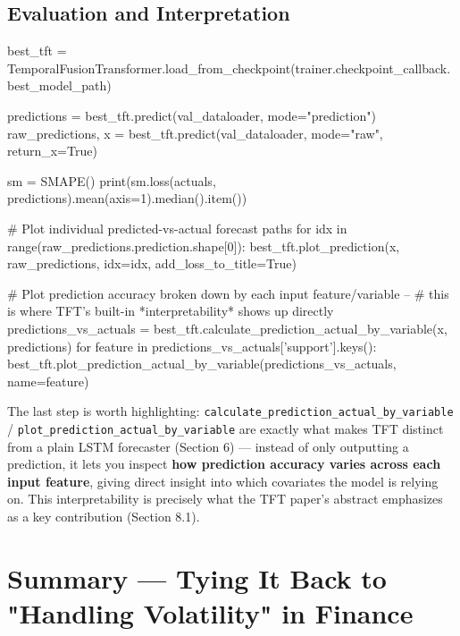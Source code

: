 \documentclass[12pt,openany]{book}
\theoremstyle{definition}
\theoremstyle{remark}
\begin{document}
\subsection{Evaluation and Interpretation}

\begin{python}
best_tft = TemporalFusionTransformer.load_from_checkpoint(trainer.checkpoint_callback.best_model_path)

predictions = best_tft.predict(val_dataloader, mode="prediction")
raw_predictions, x = best_tft.predict(val_dataloader, mode="raw", return_x=True)

sm = SMAPE()
print(sm.loss(actuals, predictions).mean(axis=1).median().item())

# Plot individual predicted-vs-actual forecast paths
for idx in range(raw_predictions.prediction.shape[0]):
    best_tft.plot_prediction(x, raw_predictions, idx=idx, add_loss_to_title=True)

# Plot prediction accuracy broken down by each input feature/variable --
# this is where TFT's built-in *interpretability* shows up directly
predictions_vs_actuals = best_tft.calculate_prediction_actual_by_variable(x, predictions)
for feature in predictions_vs_actuals['support'].keys():
    best_tft.plot_prediction_actual_by_variable(predictions_vs_actuals, name=feature)
\end{python}

The last step is worth highlighting: \texttt{calculate\_prediction\_actual\_by\_variable} / \texttt{plot\_prediction\_actual\_by\_variable} are exactly what makes TFT distinct from a plain LSTM forecaster (Section 6) --- instead of only outputting a prediction, it lets you inspect \textbf{how prediction accuracy varies across each input feature}, giving direct insight into which covariates the model is relying on. This interpretability is precisely what the TFT paper's abstract emphasizes as a key contribution (Section 8.1).

\section{Summary --- Tying It Back to "Handling Volatility" in Finance}
\end{document}
